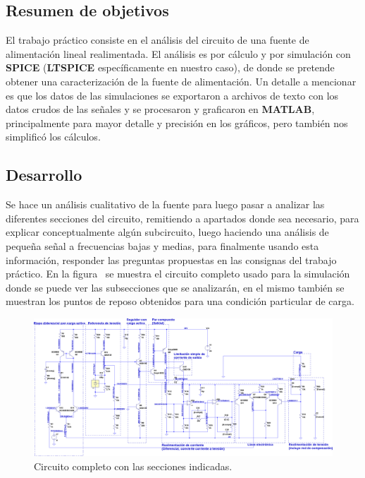 
\subsection{Resumen de objetivos}


\normalfont

El trabajo práctico consiste en el análisis del circuito de una fuente de alimentación lineal realimentada. El análisis es por cálculo y por simulación con \textbf{SPICE} (\textbf{LTSPICE} específicamente en nuestro caso), de donde se pretende obtener una caracterización de la fuente de alimentación. Un detalle a mencionar es que los datos de las simulaciones se exportaron a archivos de texto con los datos crudos de las señales y se procesaron y graficaron en \textbf{MATLAB}, principalmente para mayor detalle y precisión en los gráficos, pero también nos simplificó los cálculos.


\subsection{Desarrollo}

Se hace un análisis cualitativo de la fuente para luego pasar a analizar las diferentes secciones del circuito, remitiendo a apartados donde sea necesario, para explicar conceptualmente algún subcircuito, luego haciendo una análisis de pequeña señal a frecuencias bajas y medias, para finalmente usando esta información, responder las preguntas propuestas en las consignas del trabajo práctico.
En la figura~ se muestra el circuito completo usado para la simulación donde se puede ver las subsecciones que se analizarán, en el mismo también se muestran los puntos de reposo obtenidos para una condición particular de carga.

\clearpage


\begin{figure}[H] %
\begin{center}
\includegraphics[width=1.2 \textwidth, angle=90]{./img/desarrollo/power_supply_subsections.png}
\caption{\label{fig:fig_complete_circuit_secions}\footnotesize{Circuito completo con las secciones indicadas.}}
\end{center}
\end{figure}
